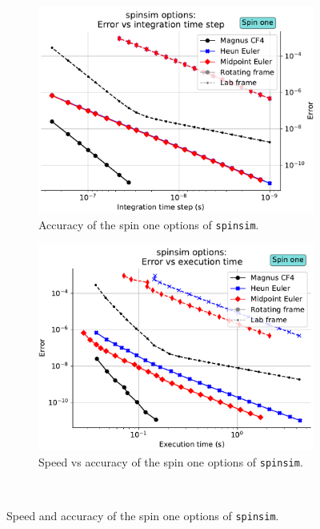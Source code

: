 \documentclass{jors}
\begin{document}
			\begin{figure}[h!]
				\begin{subfigure}[b]{0.475\textwidth}
					\includegraphics[scale=0.475]{benchmark_spin_one_step_error.pdf}
					\caption{Accuracy of the spin one options of \texttt{spinsim}.}
					\label{fig:benchmark_spin_one_step_error}
				\end{subfigure}
				\hfill
				\begin{subfigure}[b]{0.475\textwidth}
					\includegraphics[scale=0.475]{benchmark_spin_one_execution_error.pdf}
					\caption{Speed vs accuracy of the spin one options of \texttt{spinsim}.}
					\label{fig:benchmark_spin_one_execution_error}
				\end{subfigure}\
				\caption{Speed and accuracy of the spin one options of \texttt{spinsim}.}
				\label{fig:benchmark_spin_one}
			\end{figure}
\end{document}
